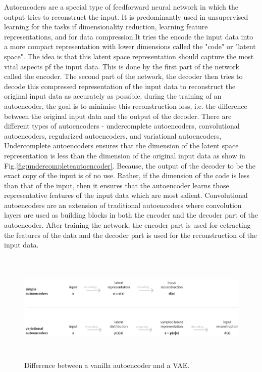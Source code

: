 Autoencoders are a special type of feedforward neural network in which the output tries to reconstruct the input. It is predominantly used in unsupervised learning for the tasks if dimensionality reduction, learning feature representations, and for data compression.It tries the encode the input data into a more compact representation with lower dimensions called the "code"\cite*{Goodfellow-et-al-2016} or "latent space". The idea is that this latent space representation should capture the most vital aspects pf the input data. This is done by the first part of the network called the encoder. The second part of the network, the decoder then tries to decode this compressed representation of the input data to reconstruct the original input data as accurately as possible. during the training of an autoencoder, the goal is to minimise this reconstruction loss, i.e. the difference between the original input data and the output of the decoder. There are different types of autoencoders - undercomplete autoencoders, convolutional autoencoders, regularized autoencoders, and variational autoencoders, \\
Undercomplete autoencoders ensures that the dimension of the latent space representation is less than the dimension of the original input data as show in Fig.\ref*{fig:undercompleteautoencoder}. Because, the output of the decoder to be the exact copy of the input is of no use. Rather, if the dimension of the code is less than that of the input, then it ensures that the autoencoder learns those representative features of the input data which are most salient\cite*{Goodfellow-et-al-2016}. Convolutional autoencoders are an extension of traditional autoencoders where convolution layers are used as building blocks in both the encoder and the decoder part of the autoencoder. After training the network, the encoder part is used for ectracting the features of the data and the decoder part is used for the reconstruction of the input data. \\
\begin{figure}[t]
  \centering
  \includegraphics[width=400pt,height=150pt]{pictures/vae.png}
  \caption{Difference between a vanilla autoencoder and a \ac{VAE}.\cite{vae_image}}
  \label{fig:vae}
\end{figure} 

